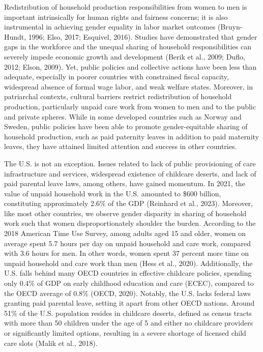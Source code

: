 \documentclass[
  11pt,
]{article}
\begin{document}
Redistribution of household production responsibilities from women to
men is important intrinsically for human rights and fairness concerns;
it is also instrumental in achieving gender equality in labor market
outcomes (Bruyn-Hundt, 1996; Elso, 2017; Esquivel, 2016). Studies have
demonstrated that gender gaps in the workforce and the unequal sharing
of household responsibilities can severely impede economic growth and
development (Berik et al., 2009; Duflo, 2012; Elson, 2009). Yet, public
policies and collective actions have been less than adequate, especially
in poorer countries with constrained fiscal capacity, widespread absence
of formal wage labor, and weak welfare states. Moreover, in patriarchal
contexts, cultural barriers restrict redistribution of household
production, particularly unpaid care work from women to men and to the
public and private spheres. While in some developed countries such as
Norway and Sweden, public policies have been able to promote
gender-equitable sharing of household production, such as paid paternity
leaves in addition to paid maternity leaves, they have attained limited
attention and success in other countries.

The U.S. is not an exception. Issues related to lack of public
provisioning of care infrastructure and services, widespread existence
of childcare deserts, and lack of paid parental leave laws, among
others, have gained momentum. In 2021, the value of unpaid household
work in the U.S. amounted to \$600 billion, constituting approximately
2.6\% of the GDP (Reinhard et al., 2023). Moreover, like most other
countries, we observe gender disparity in sharing of household work such
that women disproportionately shoulder the burden. According to the 2018
American Time Use Survey, among adults aged 15 and older, women on
average spent 5.7 hours per day on unpaid household and care work,
compared with 3.6 hours for men. In other words, women spent 37 percent
more time on unpaid household and care work than men (Hess et al.,
2020). Additionally, the U.S. falls behind many OECD countries in
effective childcare policies, spending only 0.4\% of GDP on early
childhood education and care (ECEC), compared to the OECD average of
0.8\% (OECD, 2020). Notably, the U.S. lacks federal laws granting paid
parental leave, setting it apart from other OECD nations. Around 51\% of
the U.S. population resides in childcare deserts, defined as census
tracts with more than 50 children under the age of 5 and either no
childcare providers or significantly limited options, resulting in a
severe shortage of licensed child care slots (Malik et al., 2018).
\end{document}

